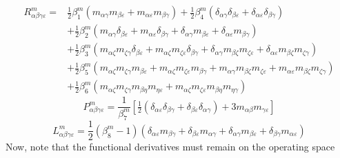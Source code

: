 \documentclass[reqno]{article}
\begin{document}
  \begin{equation}
    \begin{split}
    R^m_{\alpha\beta\gamma\varepsilon}
    =
    &\tfrac12 \beta^m_1 \left(
      m_{\alpha\gamma}m_{\beta\varepsilon}
      + m_{\alpha\varepsilon}m_{\beta\gamma}
    \right)
    + \tfrac12 \beta^m_4 \left(
      \delta_{\alpha\gamma} \delta_{\beta\varepsilon}
      + \delta_{\alpha\varepsilon}\delta_{\beta\gamma}
    \right) \\
    &+ \tfrac12 \beta^m_2 \left(
      m_{\alpha\gamma} \delta_{\beta\varepsilon}
      + m_{\alpha \varepsilon} \delta_{\beta\gamma}
      + \delta_{\alpha\gamma} m_{\beta\varepsilon}
      + \delta_{\alpha\varepsilon} m_{\beta\gamma}
    \right) \\
    &+ \tfrac12 \beta^m_3 \left(
      m_{\alpha\zeta} m_{\zeta\gamma} \delta_{\beta\varepsilon}
      + m_{\alpha\zeta} m_{\zeta\varepsilon} \delta_{\beta\gamma}
      + \delta_{\alpha \gamma} m_{\beta\zeta} m_{\zeta\varepsilon}
      + \delta_{\alpha\varepsilon} m_{\beta\zeta} m_{\zeta\gamma}
    \right) \\
    &+ \tfrac12 \beta^m_5 \left(
      m_{\alpha\zeta} m_{\zeta\gamma} m_{\beta\varepsilon}
      + m_{\alpha\zeta} m_{\zeta\varepsilon} m_{\beta\gamma}
      + m_{\alpha\gamma} m_{\beta\zeta} m_{\zeta \varepsilon}
      + m_{\alpha\varepsilon} m_{\beta\zeta} m_{\zeta \gamma}
    \right) \\
    &+ \tfrac12 \beta^m_6 \left(
      m_{\alpha\zeta} m_{\zeta\gamma} m_{\beta\eta} m_{\eta\varepsilon}
      + m_{\alpha\zeta} m_{\zeta\varepsilon} m_{\beta\eta} m_{\eta\gamma}
    \right)
    \end{split}
  \end{equation}
  \begin{equation}
    P^m_{\alpha\beta\gamma\varepsilon}
    =
    \frac{1}{\beta^m_7} \left[
      \tfrac12 \left( \delta_{\alpha\varepsilon} \delta_{\beta\gamma}
        + \delta_{\beta\varepsilon} \delta_{\alpha\gamma} \right)
      + 3 m_{\alpha\beta} m_{\gamma\varepsilon}
    \right]
  \end{equation}
  \begin{equation}
    L^m_{\alpha\beta\gamma\varepsilon}
    =
    \frac12 \left( \beta^m_8 - 1 \right) \left(
      \delta_{\alpha\varepsilon} m_{\beta\gamma} + \delta_{\beta\varepsilon} m_{\alpha\gamma}
      + \delta_{\alpha\gamma} m_{\beta\varepsilon} + \delta_{\beta\gamma} m_{\alpha\varepsilon}
    \right)
  \end{equation}
  Now, note that the functional derivatives must remain on the operating space
\end{document}
